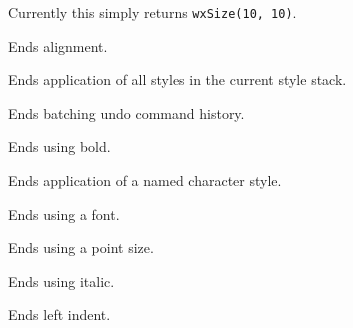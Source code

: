 Currently this simply returns {\tt wxSize(10, 10)}.

\label{wxrichtextctrlendalignment}


Ends alignment.

\label{wxrichtextctrlendallstyles}


Ends application of all styles in the current style stack.

\label{wxrichtextctrlendbatchundo}


Ends batching undo command history.

\label{wxrichtextctrlendbold}


Ends using bold.

\label{wxrichtextctrlendcharacterstyle}


Ends application of a named character style.

\label{wxrichtextctrlendfont}


Ends using a font.

\label{wxrichtextctrlendfontsize}


Ends using a point size.

\label{wxrichtextctrlenditalic}


Ends using italic.

\label{wxrichtextctrlendleftindent}


Ends left indent.

\label{wxrichtextctrlendlinespacing}



